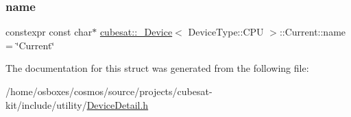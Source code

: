 \subsubsection{\texorpdfstring{name}{name}}
{\footnotesize\ttfamily constexpr const char$\ast$ \hyperlink{structcubesat_1_1__Device}{cubesat\+::\+\_\+\+Device}$<$ Device\+Type\+::\+C\+PU $>$\+::Current\+::name = \char`\"{}Current\char`\"{}\hspace{0.3cm}{\ttfamily [static]}}



The documentation for this struct was generated from the following file\+:\begin{DoxyCompactItemize}
\item 
/home/osboxes/cosmos/source/projects/cubesat-\/kit/include/utility/\hyperlink{DeviceDetail_8h}{Device\+Detail.\+h}\end{DoxyCompactItemize}
